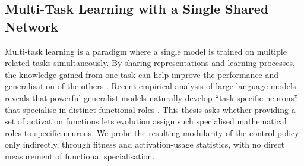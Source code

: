 \documentclass[12pt]{article}
\newcommand{\revPlain}[2]{#2}
\newcommand{\revBrit}[2]{#2}
\newcommand{\revAcro}[2]{#2}
\begin{document}
\subsection{Multi-Task Learning with a Single Shared Network}
\label{subsec:multi-task-learning-with-a-single}


Multi-task learning is a paradigm where a single model is trained on multiple related tasks simultaneously.
By sharing representations and learning processes, the knowledge gained from one task can help improve the performance and \revBrit{E-03}{generalisation} of the others \parencite{zhang_survey_2021}.
Recent empirical analysis of \revAcro{A-09}{large language models} reveals that powerful generalist models naturally develop ``task-specific neurons'' that \revBrit{E-04}{specialise} in distinct functional roles \parencite{leng_understanding_2025}.
This thesis asks whether providing a set of activation functions lets evolution assign such \revBrit{E-05}{specialised} \revPlain{P-06}{mathematical roles to specific neurons}. We probe the resulting modularity of the control policy only indirectly, through fitness and activation-usage statistics, with no direct measurement of functional specialisation.
\end{document}
